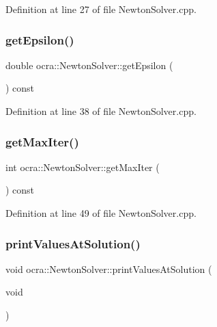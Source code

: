 Definition at line 27 of file Newton\+Solver.\+cpp.

\hypertarget{classocra_1_1NewtonSolver_a33f31688cb71c2ed817e3dbd40c0352f}{}\label{classocra_1_1NewtonSolver_a33f31688cb71c2ed817e3dbd40c0352f} 
\subsubsection{\texorpdfstring{get\+Epsilon()}{getEpsilon()}}
{\footnotesize\ttfamily double ocra\+::\+Newton\+Solver\+::get\+Epsilon (\begin{DoxyParamCaption}{ }\end{DoxyParamCaption}) const}



Definition at line 38 of file Newton\+Solver.\+cpp.

\hypertarget{classocra_1_1NewtonSolver_a044aa506a35d0a60bf8c5e4e7108dfae}{}\label{classocra_1_1NewtonSolver_a044aa506a35d0a60bf8c5e4e7108dfae} 
\subsubsection{\texorpdfstring{get\+Max\+Iter()}{getMaxIter()}}
{\footnotesize\ttfamily int ocra\+::\+Newton\+Solver\+::get\+Max\+Iter (\begin{DoxyParamCaption}{ }\end{DoxyParamCaption}) const}



Definition at line 49 of file Newton\+Solver.\+cpp.

\hypertarget{classocra_1_1NewtonSolver_a92d33f1dfe684de2051d0389816cf9a5}{}\label{classocra_1_1NewtonSolver_a92d33f1dfe684de2051d0389816cf9a5} 
\subsubsection{\texorpdfstring{print\+Values\+At\+Solution()}{printValuesAtSolution()}}
{\footnotesize\ttfamily void ocra\+::\+Newton\+Solver\+::print\+Values\+At\+Solution (\begin{DoxyParamCaption}\item[{void}]{ }\end{DoxyParamCaption})\hspace{0.3cm}{\ttfamily [virtual]}}



